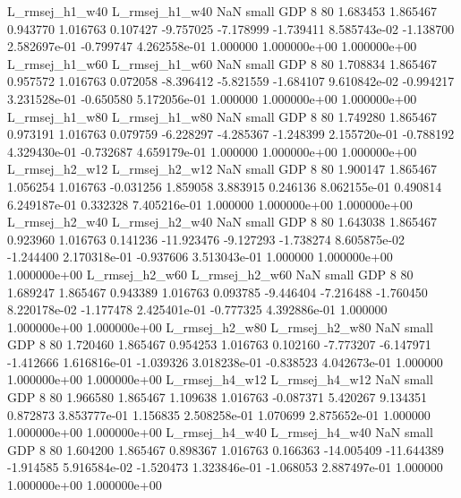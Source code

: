L_rmsej_h1_w40 L_rmsej_h1_w40                   NaN      small      GDP                 8 80 1.683453       1.865467 0.943770       1.016763    0.107427     -9.757025     -7.178999    -1.739411   8.585743e-02 -1.138700 2.582697e-01    -0.799747   4.262558e-01            1.000000    1.000000e+00        1.000000e+00
L_rmsej_h1_w60 L_rmsej_h1_w60                   NaN      small      GDP                 8 80 1.708834       1.865467 0.957572       1.016763    0.072058     -8.396412     -5.821559    -1.684107   9.610842e-02 -0.994217 3.231528e-01    -0.650580   5.172056e-01            1.000000    1.000000e+00        1.000000e+00
L_rmsej_h1_w80 L_rmsej_h1_w80                   NaN      small      GDP                 8 80 1.749280       1.865467 0.973191       1.016763    0.079759     -6.228297     -4.285367    -1.248399   2.155720e-01 -0.788192 4.329430e-01    -0.732687   4.659179e-01            1.000000    1.000000e+00        1.000000e+00
L_rmsej_h2_w12 L_rmsej_h2_w12                   NaN      small      GDP                 8 80 1.900147       1.865467 1.056254       1.016763   -0.031256      1.859058      3.883915     0.246136   8.062155e-01  0.490814 6.249187e-01     0.332328   7.405216e-01            1.000000    1.000000e+00        1.000000e+00
L_rmsej_h2_w40 L_rmsej_h2_w40                   NaN      small      GDP                 8 80 1.643038       1.865467 0.923960       1.016763    0.141236    -11.923476     -9.127293    -1.738274   8.605875e-02 -1.244400 2.170318e-01    -0.937606   3.513043e-01            1.000000    1.000000e+00        1.000000e+00
L_rmsej_h2_w60 L_rmsej_h2_w60                   NaN      small      GDP                 8 80 1.689247       1.865467 0.943389       1.016763    0.093785     -9.446404     -7.216488    -1.760450   8.220178e-02 -1.177478 2.425401e-01    -0.777325   4.392886e-01            1.000000    1.000000e+00        1.000000e+00
L_rmsej_h2_w80 L_rmsej_h2_w80                   NaN      small      GDP                 8 80 1.720460       1.865467 0.954253       1.016763    0.102160     -7.773207     -6.147971    -1.412666   1.616816e-01 -1.039326 3.018238e-01    -0.838523   4.042673e-01            1.000000    1.000000e+00        1.000000e+00
L_rmsej_h4_w12 L_rmsej_h4_w12                   NaN      small      GDP                 8 80 1.966580       1.865467 1.109638       1.016763   -0.087371      5.420267      9.134351     0.872873   3.853777e-01  1.156835 2.508258e-01     1.070699   2.875652e-01            1.000000    1.000000e+00        1.000000e+00
L_rmsej_h4_w40 L_rmsej_h4_w40                   NaN      small      GDP                 8 80 1.604200       1.865467 0.898367       1.016763    0.166363    -14.005409    -11.644389    -1.914585   5.916584e-02 -1.520473 1.323846e-01    -1.068053   2.887497e-01            1.000000    1.000000e+00        1.000000e+00

